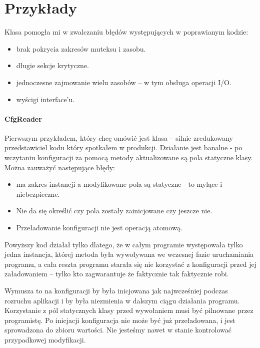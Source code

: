 \section{Przykłady}\label{sec:examples}
Klasa  pomogła mi w zwalczaniu błędów występujących w poprawianym kodzie:
\begin{itemize}
\item brak pokrycia zakresów muteksu i zasobu.
\item długie sekcje krytyczne.
\item jednoczesne zajmowanie wielu zasobów -- w tym obsługa operacji I/O.
\item wyścigi interface'u.
\end{itemize}

\paragraph{CfgReader}
Pierwszym przykładem, który chcę omówić jest klasa  -- silnie zredukowany przedstawiciel kodu który spotkałem w produkcji. Działanie jest banalne - po wczytaniu konfiguracji za pomocą metody  aktualizowane są pola statyczne klasy.
Można zauważyć następujące błędy:
\begin{itemize}
\item {} ma zakres instancji a modyfikowane pola są statyczne - to mylące i niebezpieczne.
\item Nie da się określić czy pola zostały zainicjowane czy jeszcze nie.
\item Przeładowanie konfiguracji nie jest operacją atomową.
\end{itemize}
Powyższy kod działał tylko dlatego, że w całym programie występowała tylko jedna instancja, której metoda była wywoływana we wczesnej fazie uruchamiania programu, a cała reszta programu starała się nie korzystać z konfiguracji przed jej załadowaniem -- tylko kto zagwarantuje że faktycznie tak faktycznie robi.

Wymusza to na konfiguracji by była inicjowana jak najwcześniej podczas rozruchu aplikacji i by była niezmienia w dalszym ciągu działania programu. Korzystanie z pól statycznych klasy przed wywołaniem  musi być pilnowane przez programistę. Po inicjacji konfiguracja nie może być już przeładowana, i jest sprowadzona do zbioru wartości. Nie jesteśmy nawet w stanie kontrolować przypadkowej modyfikacji.

